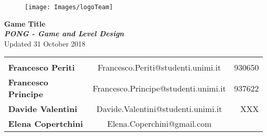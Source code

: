\documentclass[12pt]{report}
\begin{document}
\begin{center}
  \begin{figure}
    \centering
  \vspace*{5\baselineskip}
  \texttt{[image: Images/logoTeam]}
  \end{figure}

  {\large \textbf{Game Title}} \\
  \textbf{\textit{PONG - Game and Level Design}} \\
  {\small Updated 31 October 2018} \\

\begin{tabular}{lcr}\\\\
\textbf{Francesco Periti}    & Francesco.Periti@studenti.unimi.it   & 930650\\
\textbf{Francesco Principe}  & Francesco.Principe@studenti.unimi.it & 937622\\
\textbf{Davide Valentini}    & Davide.Valentini@studenti.unimi.it   & XXX\\
\textbf{Elena Copertchini}   & Elena.Coperchini@gmail.com &\\
\end{tabular}

\end{center}







  
\end{document}
